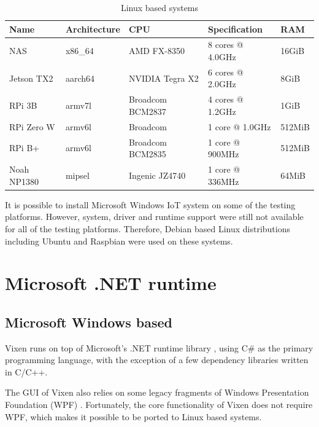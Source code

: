 \begin{table}[!h]
  \centering
  \begin{tabular}{l|l|l|l|l}
    \hline
    \textbf{Name} & \textbf{Architecture} & \textbf{CPU} & \textbf{Specification} & \textbf{RAM} \\
    \hline
    NAS         & x86\_64 & AMD FX-8350       & 8 cores @ 4.0GHz  & 16GiB   \\ \hline
    Jetson TX2  & aarch64 & NVIDIA Tegra X2   & 6 cores @ 2.0GHz  & 8GiB    \\ \hline
    RPi 3B      & armv7l  & Broadcom BCM2837  & 4 cores @ 1.2GHz  & 1GiB    \\ \hline
    RPi Zero W  & armv6l  & Broadcom          & 1 core @ 1.0GHz   & 512MiB  \\ \hline
    RPi B+      & armv6l  & Broadcom BCM2835  & 1 core @ 900MHz   & 512MiB  \\ \hline
    Noah NP1380 & mipsel  & Ingenic JZ4740    & 1 core @ 336MHz   & 64MiB   \\ \hline
  \end{tabular}
  \caption{Linux based systems}
  \label{tbl:linux}
\end{table}

It is possible to install Microsoft Windows IoT system on some of the testing platforms. However, system, driver and runtime support were still not available for all of the testing platforms. Therefore, Debian \cite{debian} based Linux distributions including Ubuntu \cite{ubuntu} and Raspbian \cite{raspbian} were used on these systems.

\section{Microsoft .NET runtime}

\subsection{Microsoft Windows based}

Vixen runs on top of Microsoft's .NET runtime library \cite{platt2002introducing}, using C\# \cite{hejlsberg2003c} as the primary programming language, with the exception of a few dependency libraries written in C/C++.

The GUI of Vixen also relies on some legacy fragments of Windows Presentation Foundation (WPF) \cite{wpf}. Fortunately, the core functionality of Vixen does not require WPF, which makes it possible to be ported to Linux based systems.


